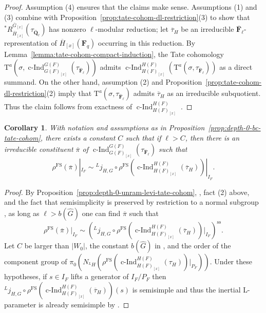\documentclass[reqno]{amsart}
\numberwithin{equation}{subsection}
\newcommand{\F}{\mathbf{F}}
\newcommand{\Q}{\mathbf{Q}}
\newcommand{\ol}[1]{\overline{#1}}
\newcommand{\wh}[1]{\widehat{#1}}
\newcommand{\ld}{{}^L}
\DeclareMathOperator{\FS}{FS}
\DeclareMathOperator{\cInd}{c-Ind}
\newcommand{\rT}{\ensuremath{\mathrm{T}}\xspace}
\renewcommand{\ss}{\mathrm{ss}}
\newtheorem{cor}[thm]{Corollary}
\theoremstyle{remark}
\numberwithin{equation}{subsection}
\numberwithin{figure}{subsection}
\begin{document}
\begin{proof}
    Assumption (4) ensures that the claims make sense. Assumptions (1) and (3) combine with Proposition~\ref{prop:tate-cohom-dl-restriction}(3) to show that $^*R_{\ol H_{[x]}}^{\ol G_{[x]}}(\tau_{\ol\Q_\ell})$ has nonzero $\ell$-modular reduction; let $\ol\tau_H$ be an irreducible $\ol\F_\ell$-representation of $\ol H_{[x]}(\F_q)$ occurring in this reduction. By Lemma~\ref{lemma:tate-cohom-compact-induction}, the Tate cohomology $\rT^a(\sigma, \cInd_{G(F)_{[x]}}^{G(F)}(\tau_{\ol\F_\ell}))$ admits $\cInd_{H(F)_{[x]}}^{H(F)}(\rT^a(\sigma, \tau_{\ol\F_\ell}))$ as a direct summand. On the other hand, assumption (2) and Proposition~\ref{prop:tate-cohom-dl-restriction}(2) imply that $\rT^a(\sigma, \tau_{\ol\F_\ell})$ admits $\ol\tau_H$ as an irreducible subquotient. Thus the claim follows from exactness of $\cInd_{H(F)_{[x]}}^{H(F)}$ \cite[Chapitre I, 5.10 i)]{Vig96}.
\end{proof}

\begin{cor}\label{cor:fs-depth-0-unram-twisted-levi}
    With notation and assumptions as in Proposition~\ref{prop:depth-0-bc-tate-cohom}, there exists a constant $C$ such that if $\ell > C$, then there is an irreducible constituent $\ol\pi$ of $\cInd_{G(F)_{[x]}}^{G(F)}(\tau_{\ol\F_\ell})$ such that
    \[
    \rho^{\FS}(\ol\pi)|_{I_F} \sim \ld j_{H,G} \circ \rho^{\FS}(\cInd_{H(F)_{[x]}}^{H(F)}(\ol\tau_H))|_{I_F}.
    \]
\end{cor}

\begin{proof}
    By Proposition~\ref{prop:depth-0-unram-levi-tate-cohom}, \cite[Theorem~1.3.1]{F24}, fact (2) above, and the fact that semisimplicity is preserved by restriction to a normal subgroup \cite[Theorem 3.10, \S 6.3]{BMR05}, as long as $\ell > b(\wh G)$ one can find $\ol\pi$ such that
    \[
    \rho^{\FS}(\ol\pi)|_{I_F} \sim (\ld j_{H,G} \circ \rho^{\FS}(\cInd_{H(F)_{[x]}}^{H(F)}(\ol\tau_H))|_{I_F})^{\ss}.
    \]
    Let $C$ be larger than $|W_0|$, the constant $b(\wh G)$ in \cite[Theorem 1.3.1]{F24}, and the order of the component group of $\pi_0(N_{\ld H}(\rho^{\FS}(\cInd_{H(F)_{[x]}}^{H(F)}(\tau_H))|_{P_F}))$. Under these hypotheses, if $s \in I_F$ lifts a generator of $I_F/P_F$ then $\ld j_{H,G} \circ \rho^{\FS}(\cInd_{H(F)_{[x]}}^{H(F)}(\ol\tau_H))(s)$ is semisimple and thus the inertial L-parameter is already semisimple by \cite[Lemma 2.6]{BMR05}.
\end{proof}
\end{document}
